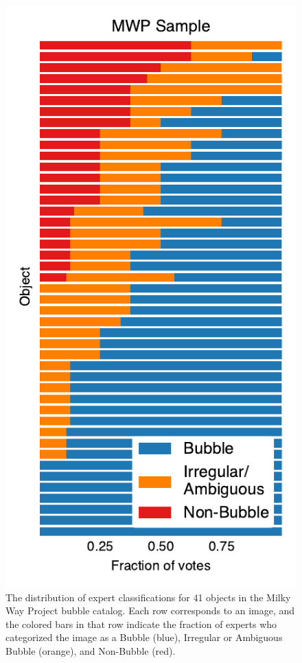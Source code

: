 \begin{figure}[h!]
\includegraphics{expert_mwp_votes}
\caption{The distribution of expert classifications for 41 objects in the Milky Way Project bubble catalog. Each row corresponds to an image, and the colored bars in that row indicate the fraction of experts who categorized the image as a Bubble (blue), Irregular or Ambiguous Bubble (orange), and Non-Bubble (red).}
\label{fig:expert_mwp_votes}
\end{figure}

